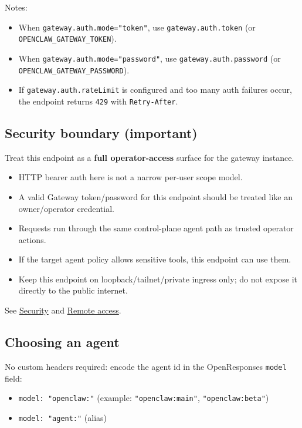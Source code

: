 Notes:

\begin{itemize}
  \item When \texttt{gateway.auth.mode="token"}, use \texttt{gateway.auth.token} (or \texttt{OPENCLAW\_GATEWAY\_TOKEN}).
  \item When \texttt{gateway.auth.mode="password"}, use \texttt{gateway.auth.password} (or \texttt{OPENCLAW\_GATEWAY\_PASSWORD}).
  \item If \texttt{gateway.auth.rateLimit} is configured and too many auth failures occur, the endpoint returns \texttt{429} with \texttt{Retry-After}.
\end{itemize}


\subsection{Security boundary (important)}


Treat this endpoint as a \textbf{full operator-access} surface for the gateway instance.

\begin{itemize}
  \item HTTP bearer auth here is not a narrow per-user scope model.
  \item A valid Gateway token/password for this endpoint should be treated like an owner/operator credential.
  \item Requests run through the same control-plane agent path as trusted operator actions.
  \item If the target agent policy allows sensitive tools, this endpoint can use them.
  \item Keep this endpoint on loopback/tailnet/private ingress only; do not expose it directly to the public internet.
\end{itemize}


See \href{/gateway/security}{Security} and \href{/gateway/remote}{Remote access}.

\subsection{Choosing an agent}


No custom headers required: encode the agent id in the OpenResponses \texttt{model} field:

\begin{itemize}
  \item \texttt{model: "openclaw:"} (example: \texttt{"openclaw:main"}, \texttt{"openclaw:beta"})
  \item \texttt{model: "agent:"} (alias)
\end{itemize}


